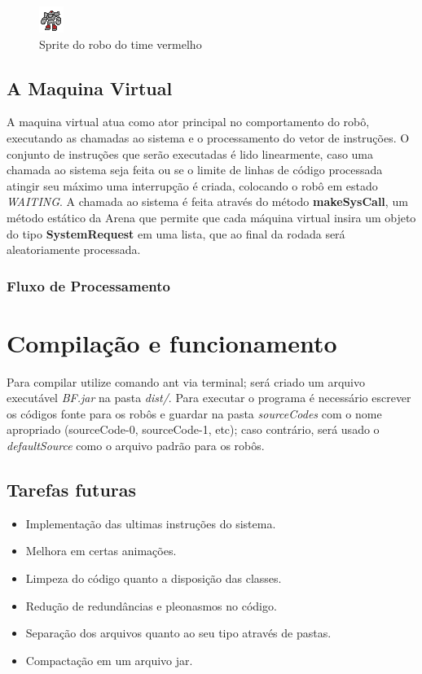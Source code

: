 \documentclass[a4paper]{article}
\begin{document}
\begin{figure}[htb]
\begin{center}
\includegraphics[scale=1]{images/roboB2.png}
\caption{Sprite do robo do time vermelho}
\end{center}
\end{figure}



\subsection{A Maquina Virtual}
A maquina virtual atua como ator principal no comportamento do robô, executando as chamadas ao sistema e o processamento do vetor de instruções. O conjunto de instruções que serão executadas é lido linearmente, caso uma chamada ao sistema seja feita ou se o limite de linhas de código processada atingir seu máximo uma interrupção é criada, colocando o robô em estado \textit{WAITING}. A chamada ao sistema é feita através do método \textbf{makeSysCall}, um método estático da Arena que permite que cada máquina virtual insira um objeto do tipo \textbf{SystemRequest} em uma lista, que ao final da rodada será aleatoriamente processada.
\subsubsection{Fluxo de Processamento}

\section{Compilação e funcionamento}
Para compilar utilize comando ant via terminal; será criado um arquivo executável \textit{BF.jar} na pasta \textit{dist/}. Para executar o programa é necessário escrever os códigos fonte para os robôs e guardar na pasta \textit{sourceCodes} com o nome apropriado (sourceCode-0, sourceCode-1, etc); caso contrário, será usado o \textit{defaultSource} como o arquivo padrão para os robôs.

\subsection{Tarefas futuras}
\begin{itemize}
\item{Implementação das ultimas instruções do sistema.}
\item{Melhora em certas animações.}
\item{Limpeza do código quanto a disposição das classes.}
\item{Redução de redundâncias e pleonasmos no código.}
\item{Separação dos arquivos quanto ao seu tipo através de pastas.}
\item{Compactação em um arquivo jar.}
\end{itemize}
\end{document}
